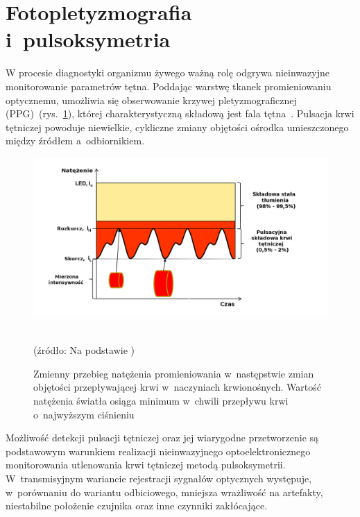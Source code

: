 \section{Fotopletyzmografia i~pulsoksymetria}
\label{sec:Fotopletyzmografia}

W procesie diagnostyki organizmu żywego ważną rolę odgrywa nieinwazyjne monitorowanie parametrów tętna. Poddając warstwę tkanek promieniowaniu optycznemu, umożliwia się obserwowanie krzywej 
pletyzmograficznej (PPG)~(rys.~\ref{rys:PPG}), której charakterystyczną składową jest fala tętna~\cite{Cys:2007}. Pulsacja krwi tętniczej powoduje niewielkie, cykliczne zmiany objętości 
ośrodka umieszczonego między źródłem a~odbiornikiem. 
\begin{figure}[!ht]
\centerline{\includegraphics[scale = 0.40]{graphic/PPG.png}}
	\caption{Zmienny przebieg natężenia promieniowania w~następstwie zmian objętości przepływającej krwi w~naczyniach krwionośnych. Wartość natężenia światła osiąga
		 minimum w~chwili przepływu krwi o~najwyższym ciśnieniu}
	~\\
	(źródło: Na podstawie \cite{Dwyer:2008})
	\label{rys:PPG}
\end{figure}
Możliwość detekcji pulsacji tętniczej oraz jej wiarygodne przetworzenie są podstawowym warunkiem realizacji nieinwazyjnego 
optoelektronicznego monitorowania utlenowania krwi tętniczej metodą pulsoksymetrii. W~transmisyjnym wariancie rejestracji sygnałów optycznych występuje, w~porównaniu do wariantu 
odbiciowego, mniejsza wrażliwość na artefakty, niestabilne położenie czujnika oraz inne czynniki zakłócające.

